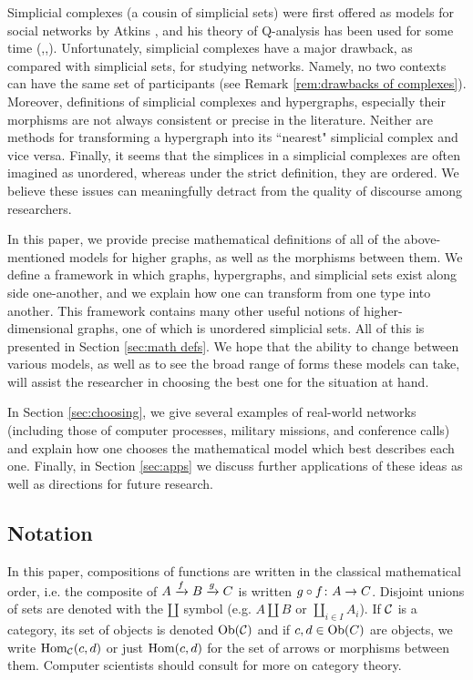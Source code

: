 \documentclass{amsart}
\begin{document}
Simplicial complexes (a cousin of simplicial sets) were first offered as models for social networks by Atkins \cite{Atk}, and his theory of Q-analysis has been used for some time (\cite{Fre},\cite{JY},\cite{ZTB}).  Unfortunately, simplicial complexes have a major drawback, as compared with simplicial sets, for studying networks.  Namely, no two contexts can have the same set of participants (see Remark \ref{rem:drawbacks of complexes}).  Moreover, definitions of simplicial complexes and hypergraphs, especially their morphisms are not always consistent or precise in the literature.  Neither are methods for transforming a hypergraph into its ``nearest" simplicial complex and vice versa.  Finally, it seems that the simplices in a simplicial complexes are often imagined as unordered, whereas under the strict definition, they are ordered.  We believe these issues can meaningfully detract from the quality of discourse among researchers.

In this paper, we provide precise mathematical definitions of all of the above-mentioned models for higher graphs, as well as the morphisms between them.   We define a framework in which graphs, hypergraphs, and simplicial sets exist along side one-another, and we explain how one can transform from one type into another.  This framework contains many other useful notions of higher-dimensional graphs, one of which is unordered simplicial sets.  All of this is presented in Section \ref{sec:math defs}.  We hope that the ability to change between various models, as well as to see the broad range of forms these models can take, will assist the researcher in choosing the best one for the situation at hand.

In Section \ref{sec:choosing}, we give several examples of real-world networks (including those of computer processes, military missions, and conference calls) and explain how one chooses the mathematical model which best describes each one.  Finally, in Section \ref{sec:apps} we discuss further applications of these ideas as well as directions for future research.  

\subsection{Notation}

In this paper, compositions of functions are written in the classical mathematical order, i.e. the composite of $A\xrightarrow{f}B\xrightarrow{g}C$ is written $g\circ f\colon A\rightarrow C$.  Disjoint unions of sets are denoted with the \;$\amalg$\; symbol (e.g. $A\amalg B$ or $\coprod_{i\in I}A_i$).  If $\mathcal{C}$ is a category, its set of objects is denoted $\textnormal{Ob}(\mathcal{C})$ and if $c,d\in\textnormal{Ob}(C)$ are objects, we write $\textnormal{Hom}_\mathcal{C}(c,d)$ or just $\textnormal{Hom}(c,d)$ for the set of arrows or morphisms between them.  Computer scientists should consult \cite{Pie} for more on category theory.
\end{document}
